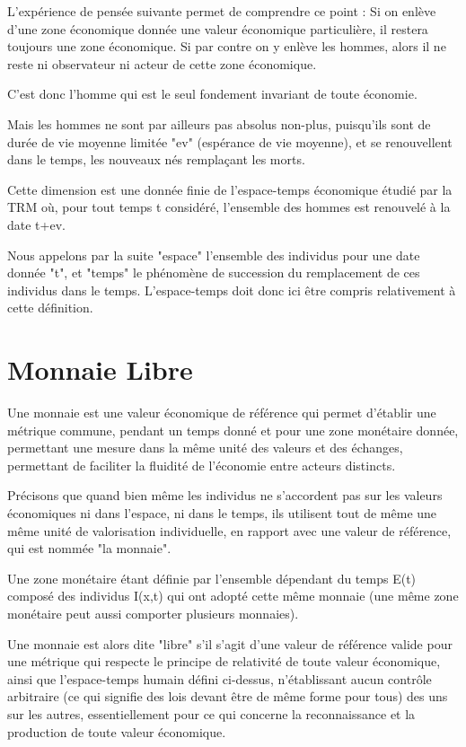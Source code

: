 \documentclass[a4paper,oneside,12pt]{article}
\begin{document}
L'expérience de pensée suivante permet de comprendre ce point : Si on enlève d'une zone économique donnée une valeur économique particulière, il restera toujours une zone économique. Si par contre on y enlève les hommes, alors il ne reste ni observateur ni acteur de cette zone économique.

C'est donc l'homme qui est le seul fondement invariant de toute économie.

Mais les hommes ne sont par ailleurs pas absolus non-plus, puisqu'ils sont de durée de vie moyenne limitée "ev" (espérance de vie moyenne), et se renouvellent dans le temps, les nouveaux nés remplaçant les morts.

Cette dimension est une donnée finie de l'espace-temps économique étudié par la TRM où, pour tout temps t considéré, l'ensemble des hommes est renouvelé à la date t+ev.

Nous appelons par la suite "espace" l'ensemble des individus pour une date donnée "t", et "temps" le phénomène de succession du remplacement de ces individus dans le temps. L'espace-temps doit donc ici être compris relativement à cette définition.

\section{Monnaie Libre}

Une monnaie est une valeur économique de référence qui permet d'établir une métrique commune, pendant un temps donné et pour une zone monétaire donnée, permettant une mesure dans la même unité des valeurs et des échanges, permettant de faciliter la fluidité de l'économie entre acteurs distincts.

Précisons que quand bien même les individus ne s'accordent pas sur les valeurs économiques ni dans l'espace, ni dans le temps, ils utilisent tout de même une même unité de valorisation individuelle, en rapport avec une valeur de référence, qui est nommée "la monnaie".

Une zone monétaire étant définie par l'ensemble dépendant du temps E(t) composé des individus I(x,t) qui ont adopté cette même monnaie (une même zone monétaire peut aussi comporter plusieurs monnaies).

Une monnaie est alors dite "libre" s'il s'agit d'une valeur de référence valide pour une métrique qui respecte le principe de relativité de toute valeur économique, ainsi que l'espace-temps humain défini ci-dessus, n'établissant aucun contrôle arbitraire (ce qui signifie des lois devant être de même forme pour tous) des uns sur les autres, essentiellement pour ce qui concerne la reconnaissance et la production de toute valeur économique.
\end{document}
